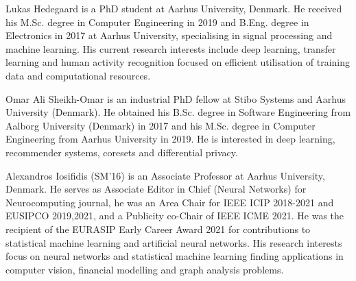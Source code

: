 \documentclass[journal]{IEEEtran}
\begin{document}
\renewcommand*{\bibfont}{\small}





\begin{IEEEbiography}{Lukas Hedegaard}
is a PhD student at Aarhus University, Denmark. He received his M.Sc. degree in Computer Engineering in 2019 and B.Eng. degree in Electronics in 2017 at Aarhus University, specialising in signal processing and machine learning. His current research interests include deep learning, transfer learning and human activity recognition focused on efficient utilisation of training data and computational resources.
\end{IEEEbiography}


\begin{IEEEbiography}{Omar Ali Sheikh-Omar} is an industrial PhD fellow at Stibo Systems and Aarhus University (Denmark). He obtained his B.Sc. degree in Software Engineering from Aalborg University (Denmark) in 2017 and his M.Sc. degree in Computer Engineering from Aarhus University in 2019. He is interested in deep learning, recommender systems, coresets and differential privacy.
\end{IEEEbiography}


\begin{IEEEbiography}{Alexandros Iosifidis} (SM'16) is an Associate Professor at Aarhus University, Denmark. He serves as Associate Editor in Chief (Neural Networks) for Neurocomputing journal, he was an Area Chair for IEEE ICIP 2018-2021 and EUSIPCO 2019,2021, and a Publicity co-Chair of IEEE ICME 2021. He was the recipient of the EURASIP Early Career Award 2021 for contributions to statistical machine learning and artificial neural networks. His research interests focus on neural networks and statistical machine learning finding applications in computer vision, financial modelling and graph analysis problems.
\end{IEEEbiography} 
\end{document}
